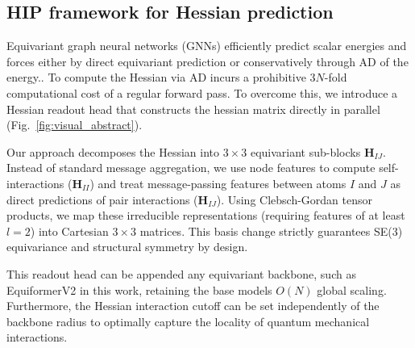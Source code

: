 \documentclass[pdflatex,sn-mathphys-num]{sn-jnl}%
\theoremstyle{thmstyleone}%
\theoremstyle{thmstyletwo}%
\theoremstyle{thmstylethree}%
\begin{document}


\subsection{HIP framework for Hessian prediction}

Equivariant graph neural networks (GNNs) efficiently predict scalar energies and forces either by direct equivariant prediction or conservatively through AD of the energy.\cite{schutt2018,duvalHitchhikerGuideGeometric2024a,duvenaud2015convolutional,bigiDarkSideForces2025}. To compute the Hessian via AD incurs a prohibitive $3N$-fold computational cost of a regular forward pass. To overcome this, we introduce a Hessian readout head that constructs the hessian matrix directly in parallel (Fig.~\ref{fig:visual_abstract}). 

Our approach decomposes the Hessian into  $3 \times 3$ equivariant sub-blocks $\mathbf{H}_{IJ}$. Instead of standard message aggregation, we use node features to compute self-interactions ($\mathbf{H}_{II}$) and treat message-passing features between atoms $I$ and $J$ as direct predictions of pair interactions ($\mathbf{H}_{IJ}$). Using Clebsch-Gordan tensor products, we map these irreducible representations (requiring features of at least $l=2$) into Cartesian $3 \times 3$ matrices. This basis change strictly guarantees SE(3) equivariance and structural symmetry by design. 

This readout head can be appended any equivariant backbone, such as EquiformerV2\cite{liao2023equiformerv2} in this work, retaining the base models $O(N)$ global scaling. Furthermore, the Hessian interaction cutoff can be set independently of the backbone radius to optimally capture the locality of quantum mechanical interactions. 
\end{document}
